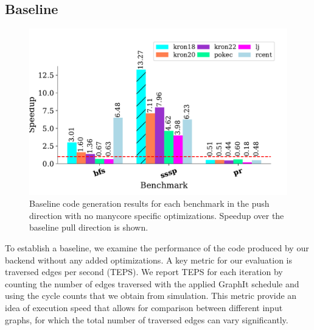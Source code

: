 \subsection{Baseline}
 
\begin{figure}[h!]
    \centering
    \includegraphics[scale = 0.6]{graphit-figures/push.pdf}
    \caption{Baseline code generation results for each benchmark in the push direction with no manycore specific optimizations. Speedup over the baseline pull direction is shown.}
    \label{pap:generals:sec:eval:fig:push}
\end{figure}
To establish a baseline, we examine the performance of the code produced by our backend without any added optimizations.
A key metric for our evaluation is traversed edges per second (TEPS).
We report TEPS for each iteration by counting the number of edges traversed with the applied GraphIt schedule and using the cycle counts that we obtain from simulation.
This metric provide an idea of execution speed that allows for comparison between different input graphs, for which the total number of traversed edges can vary significantly.

